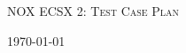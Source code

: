\documentclass{article}
\begin{document}
\begin{titlepage}
    \centering
    {\scshape\LARGE NOX ECSX 2: Test Case Plan \par}
    \vfill
    {\large \today\par}
\end{titlepage}

\tableofcontents
\pagebreak
\end{document}
